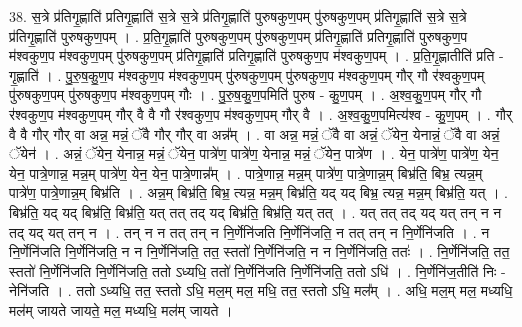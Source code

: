 \documentclass[17pt]{extarticle}
\begin{document}
38. स॒त्रे प्र॑तिगृ॒ह्णाति॑ प्रतिगृ॒ह्णाति॑ स॒त्रे स॒त्रे प्र॑तिगृ॒ह्णाति॑ पुरुषकुण॒पम् पु॑रुषकुण॒पम् प्र॑तिगृ॒ह्णाति॑ स॒त्रे स॒त्रे प्र॑तिगृ॒ह्णाति॑ पुरुषकुण॒पम् । . प्र॒ति॒गृ॒ह्णाति॑ पुरुषकुण॒पम् पु॑रुषकुण॒पम् प्र॑तिगृ॒ह्णाति॑ प्रतिगृ॒ह्णाति॑ पुरुषकुण॒प म॑श्वकुण॒प म॑श्वकुण॒पम् पु॑रुषकुण॒पम् प्र॑तिगृ॒ह्णाति॑ प्रतिगृ॒ह्णाति॑ पुरुषकुण॒प म॑श्वकुण॒पम् । . प्र॒ति॒गृ॒ह्णातीति॑ प्रति - गृ॒ह्णाति॑ । . पु॒रु॒ष॒कु॒ण॒प म॑श्वकुण॒प म॑श्वकुण॒पम् पु॑रुषकुण॒पम् पु॑रुषकुण॒प म॑श्वकुण॒पम् गौर् गौ र॑श्वकुण॒पम् पु॑रुषकुण॒पम् पु॑रुषकुण॒प म॑श्वकुण॒पम् गौः । . पु॒रु॒ष॒कु॒ण॒पमिति॑ पुरुष - कु॒ण॒पम् । . अ॒श्व॒कु॒ण॒पम् गौर् गौ र॑श्वकुण॒प म॑श्वकुण॒पम् गौर् वै वै गौ र॑श्वकुण॒प म॑श्वकुण॒पम् गौर् वै । . अ॒श्व॒कु॒ण॒पमित्य॑श्व - कु॒ण॒पम् । . गौर् वै वै गौर् गौर् वा अन्न॒ मन्नं॒ ॅवै गौर् गौर् वा अन्न᳚म् । . वा अन्न॒ मन्नं॒ ॅवै वा अन्नं॒ ॅयेन॒ येनान्नं॒ ॅवै वा अन्नं॒ ॅयेन॑ । . अन्नं॒ ॅयेन॒ येनान्न॒ मन्नं॒ ॅयेन॒ पात्रे॑ण॒ पात्रे॑ण॒ येनान्न॒ मन्नं॒ ॅयेन॒ पात्रे॑ण । . येन॒ पात्रे॑ण॒ पात्रे॑ण॒ येन॒ येन॒ पात्रे॒णान्न॒ मन्न॒म् पात्रे॑ण॒ येन॒ येन॒ पात्रे॒णान्न᳚म् । . पात्रे॒णान्न॒ मन्न॒म् पात्रे॑ण॒ पात्रे॒णान्न॒म् बिभ्र॑ति॒ बिभ्र॒ त्यन्न॒म् पात्रे॑ण॒ पात्रे॒णान्न॒म् बिभ्र॑ति । . अन्न॒म् बिभ्र॑ति॒ बिभ्र॒ त्यन्न॒ मन्न॒म् बिभ्र॑ति॒ यद् यद् बिभ्र॒ त्यन्न॒ मन्न॒म् बिभ्र॑ति॒ यत् । . बिभ्र॑ति॒ यद् यद् बिभ्र॑ति॒ बिभ्र॑ति॒ यत् तत् तद् यद् बिभ्र॑ति॒ बिभ्र॑ति॒ यत् तत् । . यत् तत् तद् यद् यत् तन् न न तद् यद् यत् तन् न । . तन् न न तत् तन् न नि॒र्णेनि॑जति नि॒र्णेनि॑जति॒ न तत् तन् न नि॒र्णेनि॑जति । . न नि॒र्णेनि॑जति नि॒र्णेनि॑जति॒ न न नि॒र्णेनि॑जति॒ तत॒ स्ततो॑ नि॒र्णेनि॑जति॒ न न नि॒र्णेनि॑जति॒ ततः॑ । . नि॒र्णेनि॑जति॒ तत॒ स्ततो॑ नि॒र्णेनि॑जति नि॒र्णेनि॑जति॒ ततो ऽध्यधि॒ ततो॑ नि॒र्णेनि॑जति नि॒र्णेनि॑जति॒ ततो ऽधि॑ । . नि॒र्णेनि॑ज॒तीति॑ निः - नेनि॑जति । . ततो ऽध्यधि॒ तत॒ स्ततो ऽधि॒ मल॒म् मल॒ मधि॒ तत॒ स्ततो ऽधि॒ मल᳚म् । . अधि॒ मल॒म् मल॒ मध्यधि॒ मल॑म् जायते जायते॒ मल॒ मध्यधि॒ मल॑म् जायते । \newline
\pagebreak
{}
\end{document}
